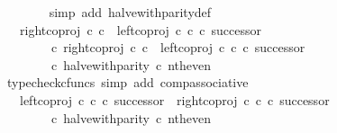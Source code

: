 \begin{isabellebody}
\ \ \ \ \ \ \isamarkupfalse%
\ {\isacharparenleft}{\kern0pt}simp\ add{\isacharcolon}{\kern0pt}\ halve{\isacharunderscore}{\kern0pt}with{\isacharunderscore}{\kern0pt}parity{\isacharunderscore}{\kern0pt}def{}{\isacharparenright}{\kern0pt}\isanewline
\ \ \ \ \isamarkupfalse%
\ \isamarkupfalse%
\ {\isachardoublequoteopen}{\isachardot}{\kern0pt}{\isachardot}{\kern0pt}{\isachardot}{\kern0pt}\ {\isacharequal}{\kern0pt}\ {\isacharparenleft}{\kern0pt}{\isacharparenleft}{\kern0pt}right{\isacharunderscore}{\kern0pt}coproj\ {\isasymnat}\isactrlsub c\ {\isasymnat}\isactrlsub c\ {\isasymamalg}\ {\isacharparenleft}{\kern0pt}left{\isacharunderscore}{\kern0pt}coproj\ {\isasymnat}\isactrlsub c\ {\isasymnat}\isactrlsub c\ {\isasymcirc}\isactrlsub c\ successor{\isacharparenright}{\kern0pt}{\isacharparenright}{\kern0pt}\isanewline
\ \ \ \ \ \ \ \ {\isasymcirc}\isactrlsub c\ {\isacharparenleft}{\kern0pt}right{\isacharunderscore}{\kern0pt}coproj\ {\isasymnat}\isactrlsub c\ {\isasymnat}\isactrlsub c\ {\isasymamalg}\ {\isacharparenleft}{\kern0pt}left{\isacharunderscore}{\kern0pt}coproj\ {\isasymnat}\isactrlsub c\ {\isasymnat}\isactrlsub c\ {\isasymcirc}\isactrlsub c\ successor{\isacharparenright}{\kern0pt}{\isacharparenright}{\kern0pt}{\isacharparenright}{\kern0pt}\isanewline
\ \ \ \ \ \ \ \ {\isasymcirc}\isactrlsub c\ halve{\isacharunderscore}{\kern0pt}with{\isacharunderscore}{\kern0pt}parity\ {\isasymcirc}\isactrlsub c\ nth{\isacharunderscore}{\kern0pt}even{\isachardoublequoteclose}\isanewline
\ \ \ \ \ \ \isamarkupfalse%
\ {\isacharparenleft}{\kern0pt}typecheck{\isacharunderscore}{\kern0pt}cfuncs{\isacharcomma}{\kern0pt}\ simp\ add{\isacharcolon}{\kern0pt}\ comp{\isacharunderscore}{\kern0pt}associative{}{\isacharparenright}{\kern0pt}\isanewline
\ \ \ \ \isamarkupfalse%
\ \isamarkupfalse%
\ {\isachardoublequoteopen}{\isachardot}{\kern0pt}{\isachardot}{\kern0pt}{\isachardot}{\kern0pt}\ {\isacharequal}{\kern0pt}\ {\isacharparenleft}{\kern0pt}{\isacharparenleft}{\kern0pt}left{\isacharunderscore}{\kern0pt}coproj\ {\isasymnat}\isactrlsub c\ {\isasymnat}\isactrlsub c\ {\isasymcirc}\isactrlsub c\ successor{\isacharparenright}{\kern0pt}\ {\isasymamalg}\ {\isacharparenleft}{\kern0pt}right{\isacharunderscore}{\kern0pt}coproj\ {\isasymnat}\isactrlsub c\ {\isasymnat}\isactrlsub c\ {\isasymcirc}\isactrlsub c\ successor{\isacharparenright}{\kern0pt}{\isacharparenright}{\kern0pt}\isanewline
\ \ \ \ \ \ \ \ {\isasymcirc}\isactrlsub c\ halve{\isacharunderscore}{\kern0pt}with{\isacharunderscore}{\kern0pt}parity\ {\isasymcirc}\isactrlsub c\ nth{\isacharunderscore}{\kern0pt}even{\isachardoublequoteclose}\isanewline

\end{isabellebody}
